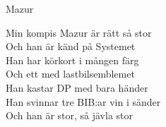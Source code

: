   {\Large Mazur}
  \begin{vers}
Min kompis Mazur är rätt så stor\\
Och han är känd på Systemet\\
Han har körkort i mången färg\\
Och ett med lastbilsemblemet\\
Han kastar DP med bara händer\\
Han svinnar tre BIB:ar vin i sänder\\
Och han är stor, så jävla stor\\
\end{vers}
 